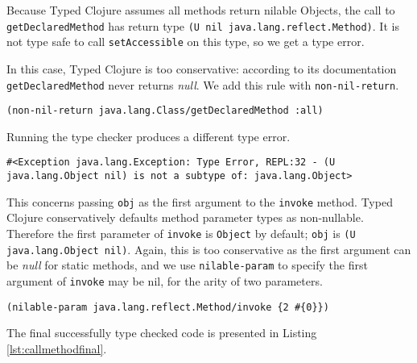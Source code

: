 Because Typed Clojure assumes all methods return nilable Objects, the call to \lstinline|getDeclaredMethod|
has return type \lstinline|(U nil java.lang.reflect.Method)|. It is not type safe to call \lstinline|setAccessible|
on this type, so we get a type error.

In this case, Typed Clojure is too conservative: according to its documentation \lstinline|getDeclaredMethod|
never returns \emph{null}. We add this rule with \lstinline|non-nil-return|.

\begin{lstlisting}
(non-nil-return java.lang.Class/getDeclaredMethod :all)
\end{lstlisting}

Running the type checker produces a different type error.

\begin{lstlisting}
#<Exception java.lang.Exception: Type Error, REPL:32 - (U java.lang.Object nil) is not a subtype of: java.lang.Object>
\end{lstlisting}

This concerns passing \lstinline|obj| as the first argument to the \lstinline|invoke| method.
Typed Clojure conservatively defaults method parameter types as non-nullable. 
Therefore the first parameter of \lstinline|invoke| is \lstinline|Object| by default; \lstinline|obj|
is \lstinline|(U java.lang.Object nil)|. Again, this is too conservative as the first argument can
be \emph{null} for static methods, and we use \lstinline|nilable-param| to specify the first argument
of \lstinline|invoke| may be nil, for the arity of two parameters.

\begin{lstlisting}
(nilable-param java.lang.reflect.Method/invoke {2 #{0}})
\end{lstlisting}

The final successfully type checked code is presented in Listing \ref{lst:callmethodfinal}.

